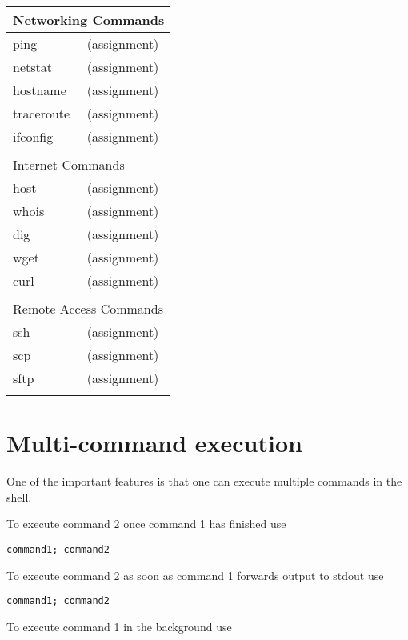 \begin{center}
\begin{longtable}{|p{4cm}|p{8cm}|}
  \hline
  \multicolumn{2}{|l|}{\cellcolor{blue!15} Networking Commands}\\
  \hline
  ping &  (assignment) \\
  netstat &  (assignment) \\
  hostname &  (assignment) \\
  traceroute &  (assignment) \\
  ifconfig &  (assignment) \\
  & \\

  \hline
  \multicolumn{2}{|l|}{\cellcolor{blue!15} Internet Commands}\\
  \hline
  host &  (assignment) \\
  whois &  (assignment) \\
  dig &  (assignment) \\
  wget &  (assignment) \\
  curl &  (assignment) \\
  & \\

  \hline
  \multicolumn{2}{|l|}{\cellcolor{blue!15} Remote Access Commands}\\
  \hline
  ssh &  (assignment) \\
  scp &  (assignment) \\
  sftp &  (assignment) \\
  & \\


\end{longtable}
\end{center}

\section{Multi-command execution}

One of the important features is that one can execute multiple
commands in the shell.

To execute command 2 once command 1 has finished use

\begin{verbatim}
command1; command2
\end{verbatim}

To execute command 2 as soon as command 1 forwards output to stdout use

\begin{verbatim}
command1; command2
\end{verbatim}

To execute command 1 in the background use

